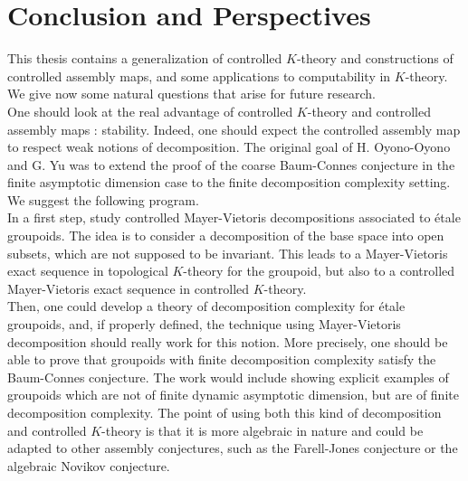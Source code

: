 \chapter{Conclusion and Perspectives}

This thesis contains a generalization of controlled $K$-theory and constructions of controlled assembly maps, and some applications to computability in $K$-theory. We give now some natural questions that arise for future research.\\ 

One should look at the real advantage of controlled $K$-theory and controlled assembly maps : stability. Indeed, one should expect the controlled assembly map to respect weak notions of decomposition. The original goal of H. Oyono-Oyono and G. Yu was to extend the proof of the coarse Baum-Connes conjecture in the finite asymptotic dimension case to the finite decomposition complexity setting. We suggest the following program.\\
 

In a first step, study controlled Mayer-Vietoris decompositions associated to étale groupoids. The idea is to consider a decomposition of the base space into open subsets, which are not supposed to be invariant. This leads to a Mayer-Vietoris exact sequence in topological $K$-theory for the groupoid, but also to a controlled Mayer-Vietoris exact sequence in controlled $K$-theory. \\

Then, one could develop a theory of decomposition complexity for étale groupoids, and, if properly defined, the technique using Mayer-Vietoris decomposition should really work for this notion. More precisely, one should be able to prove that groupoids with finite decomposition complexity satisfy the Baum-Connes conjecture. The work would include showing explicit examples of groupoids which are not of finite dynamic asymptotic dimension, but are of finite decomposition complexity. The point of using both this kind of decomposition and controlled $K$-theory is that it is more algebraic in nature and could be adapted to other assembly conjectures, such as the Farell-Jones conjecture or the algebraic Novikov conjecture. \cite{RTY} \\

